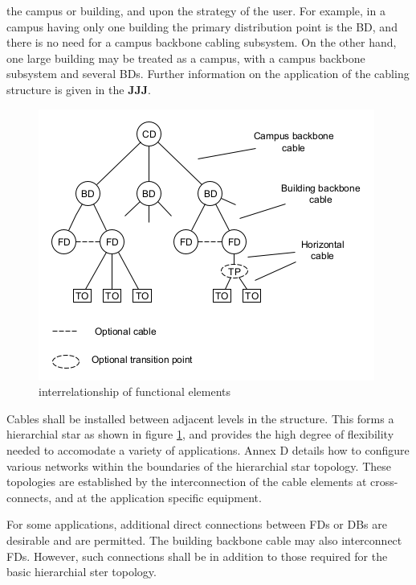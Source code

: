 the campus or building, and upon the strategy of the user. For example, in a campus having only one building the 
primary distribution point is the BD, and there is no need for a campus backbone cabling subsystem. On the other hand,
one large building may be treated as a campus, with a campus backbone subsystem and several BDs. Further information on
the application of the cabling structure is given in the \textbf{JJJ}.
\begin{figure}[h]
    \centering
    \begin{framed}
         \includegraphics[height=0.3\textheight]{pics/interrelationship}
        \caption{interrelationship of functional elements}
        \label{interrelationship}
    \end{framed}
\end{figure}

Cables shall be installed between adjacent levels in the structure. This forms a hierarchial star as shown in figure 
\ref{interrelationship}, and provides the high degree of flexibility needed to accomodate a variety of applications. Annex
D details how to configure various networks within the boundaries of the hierarchial star topology. These topologies are
established by the interconnection of the cable elements at cross-connects, and at the application specific equipment.\par

For some applications, additional direct connections between FDs or DBs are desirable and are permitted. The building
backbone cable may also interconnect FDs. However, such connections shall be in addition to those required for the basic
hierarchial ster topology.\par

